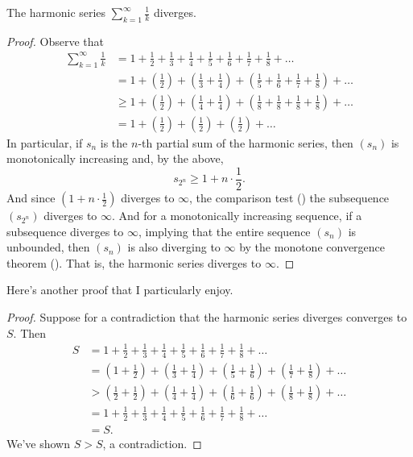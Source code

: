 \begin{theorem}
  The harmonic series $\sum_{k = 1}^{\infty} \frac{1}{k}$ diverges.
\end{theorem}

\begin{proof}
  Observe that
  \begin{align*}
    \sum_{k = 1}^{\infty} \frac{1}{k} & = 1 + \frac{1}{2} +
    \frac{1}{3} + \frac{1}{4} + \frac{1}{5} + \frac{1}{6} +
    \frac{1}{7} + \frac{1}{8} + \dots \\
    & = 1 + \left(\frac{1}{2}\right) + \left(\frac{1}{3} + \frac{1}{4}\right) +
    \left(\frac{1}{5} + \frac{1}{6} + \frac{1}{7} +
    \frac{1}{8}\right) + \dots \\
    & \geq 1 + \left(\frac{1}{2}\right) + \left(\frac{1}{4} +
    \frac{1}{4}\right) +
    \left(\frac{1}{8} + \frac{1}{8} + \frac{1}{8} +
    \frac{1}{8}\right) + \dots \\
    & = 1 + \left(\frac{1}{2}\right) + \left(\frac{1}{2}\right) +
    \left(\frac{1}{2}\right) + \dots
  \end{align*}
  In particular, if $s_n$ is the $n$-th partial sum of the harmonic
  series, then $(s_n)$ is monotonically increasing and, by the above,
  \[ s_{2^n} \geq 1 + n \cdot \frac{1}{2}. \]
  And since $(1 + n \cdot \frac{1}{2})$ diverges to $\infty$, the
  comparison test () the subsequence
  $(s_{2^n})$ diverges to $\infty$. And for a monotonically
  increasing sequence, if a subsequence diverges to $\infty$,
  implying that the entire sequence $(s_n)$ is unbounded, then
  $(s_n)$ is also diverging to $\infty$ by the monotone convergence
  theorem (). That is, the harmonic
  series diverges to $\infty$.
\end{proof}

Here's another proof that I particularly enjoy.

\begin{proof}
  Suppose for a contradiction that the harmonic series diverges
  converges to $S$. Then
  \begin{align*}
    S & = 1 + \frac{1}{2} + \frac{1}{3} + \frac{1}{4} + \frac{1}{5} +
    \frac{1}{6} + \frac{1}{7} + \frac{1}{8} + \dots \\
    & = \left(1 + \frac{1}{2}\right) + \left(\frac{1}{3} + \frac{1}{4}\right) +
    \left(\frac{1}{5} + \frac{1}{6}\right) + \left(\frac{1}{7} +
    \frac{1}{8}\right) + \dots \\
    & > \left(\frac{1}{2} + \frac{1}{2}\right) + \left(\frac{1}{4} +
    \frac{1}{4}\right) +
    \left(\frac{1}{6} + \frac{1}{6}\right) + \left(\frac{1}{8} +
    \frac{1}{8}\right) + \dots \\
    & = 1 + \frac{1}{2} + \frac{1}{3} + \frac{1}{4} + \frac{1}{5} +
    \frac{1}{6} + \frac{1}{7} + \frac{1}{8} + \dots \\
    & = S.
  \end{align*}
  We've shown $S > S$, a contradiction.
\end{proof}

